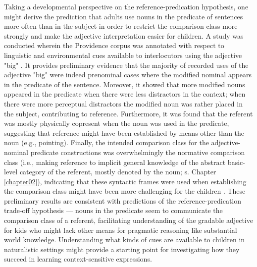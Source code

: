 Taking a developmental perspective on the reference-predication hypothesis, one might derive the prediction that adults use nouns in the predicate of sentences more often than in the subject in order to restrict the comparison class more strongly and make the adjective interpretation easier for children. A study was conducted wherein the Providence corpus was annotated with respect to linguistic and environmental cues available to interlocutors using the adjective "big" \parencite{sinelnikova2020}. It provides preliminary evidence that the majority of recorded uses of the adjective "big" were indeed prenominal cases where the modified nominal appears in the predicate of the sentence. 
Moreover, it showed that more modified nouns appeared in the predicate when there were less distractors in the context; when there were more perceptual distractors the modified noun was rather placed in the subject, contributing to reference. Furthermore, it was found that the referent was mostly physically copresent when the noun was used in the predicate, suggesting that reference might have been established by means other than the noun (e.g., pointing). Finally, the intended comparison class for the adjective-nominal predicate constructions was overwhelmingly the normative comparison class (i.e., making reference to implicit general knowledge of the abstract basic-level  category of the referent, mostly denoted by the noun; s. Chapter \ref{chapter02}), indicating that these syntactic frames were used when establishing the comparison class might have been more challenging for the children \parencite{sinelnikova2020}. These preliminary results are consistent with predictions of the reference-predication trade-off hypothesis ---  nouns in the predicate seem to communicate the comparison class of a referent, facilitating understanding of the gradable adjective for kids who might lack other means for pragmatic reasoning like substantial world knowledge. Understanding what kinds of cues are available to children in naturalistic settings might provide a starting point for investigating how they succeed in learning context-sensitive expressions. 



